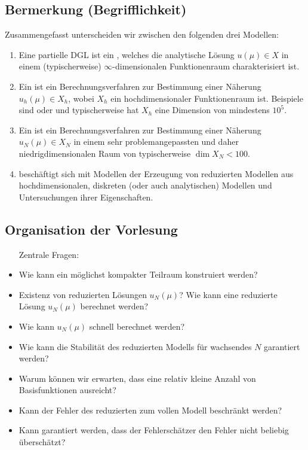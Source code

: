 \subsection{Bermerkung (Begrifflichkeit)}
\label{sub:bem_begrifflichkeit}
Zusammengefasst unterscheiden wir zwischen den folgenden drei Modellen:
\begin{enumerate}[1)]
	\item Eine partielle DGL ist ein , welches die analytische Lösung $u(\mu)\in X$ in einem (typischerweise) $\infty$-dimensionalen Funktionenraum charakterisiert ist.
	\item Ein  ist ein Berechnungsverfahren zur Bestimmung einer Näherung $u_h(\mu)\in X_h$, wobei $X_h$ ein hochdimensionaler Funktionenraum ist.
	Beispiele sind  oder  und typischerweise hat $X_h$ eine Dimension von mindestens $10^5$.
	\item Ein  ist ein Berechnungsverfahren zur Bestimmung einer Näherung $u_N(\mu)\in X_N$ in einem sehr problemangepassten und daher niedrigdimensionalen Raum von typischerweise $\dim X_N < 100$.
	\item {} beschäftigt sich mit Modellen der Erzeugung von reduzierten Modellen aus hochdimensionalen, diskreten (oder auch analytischen) Modellen und Untersuchungen ihrer Eigenschaften.
\end{enumerate}

\subsection{Organisation der Vorlesung}
\label{sub:org}
\begin{itemize}
	\item[Zentrale Fragen:]
	\item {} Wie kann ein möglichst kompakter Teilraum konstruiert werden?
	\item {} Existenz von reduzierten Lösungen $u_N(\mu)$?
	Wie kann eine reduzierte Lösung $u_N(\mu)$ berechnet werden?
	\item {} Wie kann $u_N(\mu)$ schnell berechnet werden?
	\item {} Wie kann die Stabilität des reduzierten Modells für wachsendes $N$ garantiert werden?
	\item{} Warum können wir erwarten, dass eine relativ kleine Anzahl von Basisfunktionen ausreicht?
	\item {} Kann der Fehler des reduzierten zum vollen Modell beschränkt werden?
	\item {} Kann garantiert werden, dass der Fehlerschätzer den Fehler nicht beliebig überschätzt?
\end{itemize}

